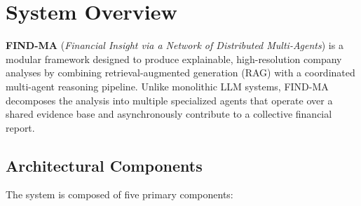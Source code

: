 \documentclass[11pt]{article}
\begin{document}



\section{System Overview}
\label{sec:overview}

\textbf{FIND-MA} (\textit{Financial Insight via a Network of Distributed Multi-Agents}) is a modular framework designed to produce explainable, high-resolution company analyses by combining retrieval-augmented generation (RAG) with a coordinated multi-agent reasoning pipeline. Unlike monolithic LLM systems, FIND-MA decomposes the analysis into multiple specialized agents that operate over a shared evidence base and asynchronously contribute to a collective financial report.

\subsection*{Architectural Components}

The system is composed of five primary components:
\end{document}
